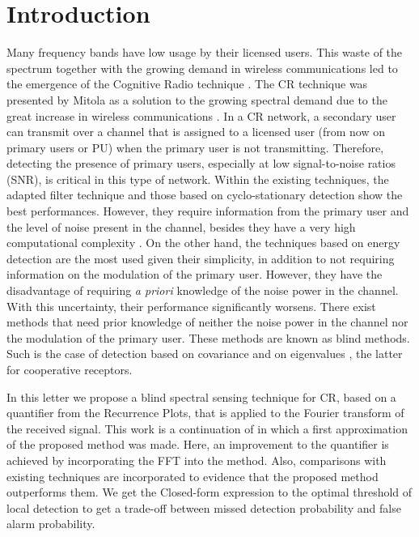 \documentclass[lettersize,journal]{IEEEtran}
\begin{document}
\section{Introduction}
Many frequency bands have low usage by their licensed users. This waste of the spectrum together with the growing demand in wireless communications led to the emergence of the Cognitive Radio technique \cite{Arjoune2019}. The CR technique was presented by Mitola as a solution to the growing spectral demand due to the great increase in wireless communications \cite{Mitola2000}.
In a CR network, a secondary user can transmit over a channel that is assigned to a licensed user (from now on primary users or PU) when the primary user is not transmitting. Therefore, detecting the presence of primary users, especially at low signal-to-noise ratios (SNR), is critical in this type of network. Within the existing techniques, the adapted filter technique \cite{Bhargavi2010} and those based on cyclo-stationary detection \cite{Chen2007} show the best performances. However, they require information from the primary user and the level of noise present in the channel, besides they have a very high computational complexity \cite{Mehdawi2014}.
On the other hand, the techniques based on energy detection  \cite{Yadav2016} are the most used given their simplicity, in addition to not requiring information on the modulation of the primary user. However, they have the disadvantage of requiring \textit{a priori} knowledge of the noise power in the channel. With this uncertainty, their performance significantly worsens. There exist methods that need prior knowledge of neither the noise power in the channel nor the modulation of the primary user. These methods are known as blind methods. Such is the case of detection based on covariance \cite{Jin2012} and on eigenvalues \cite{Zeng2009}, the latter for cooperative receptors.

In this letter we propose a blind spectral sensing technique for CR, based on a quantifier from the Recurrence Plots, that is applied to the Fourier transform of the received signal. This work is a  continuation of \cite{Antonelli2021} in which a first approximation of the proposed method was made. Here, an improvement to the quantifier is achieved by incorporating the FFT into the method. Also, comparisons with existing techniques are incorporated to evidence that the proposed method outperforms them.
We get the Closed-form expression to the optimal threshold of local detection to get a trade-off between missed detection probability and false alarm probability.
\end{document}
